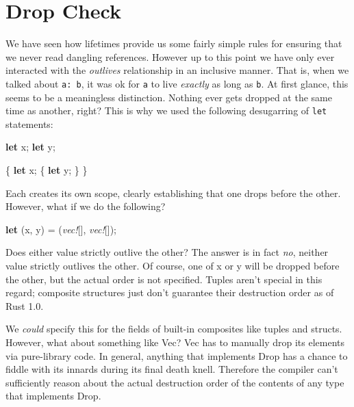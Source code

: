 \documentclass[a4paper,]{book}
\newenvironment{Shaded}{\begin{snugshade}}{\end{snugshade}}
\newcommand{\KeywordTok}[1]{\textcolor[rgb]{0.13,0.29,0.53}{\textbf{{#1}}}}
\newcommand{\PreprocessorTok}[1]{\textcolor[rgb]{0.56,0.35,0.01}{\textit{{#1}}}}
\newcommand{\NormalTok}[1]{{#1}}
\begin{document}
\section{Drop Check}\label{sec--dropck}

We have seen how lifetimes provide us some fairly simple rules for
ensuring that we never read dangling references. However up to this
point we have only ever interacted with the \emph{outlives} relationship
in an inclusive manner. That is, when we talked about
\texttt{\textquotesingle{}a:\ \textquotesingle{}b}, it was ok for
\texttt{\textquotesingle{}a} to live \emph{exactly} as long as
\texttt{\textquotesingle{}b}. At first glance, this seems to be a
meaningless distinction. Nothing ever gets dropped at the same time as
another, right? This is why we used the following desugarring of
\texttt{let} statements:

\begin{Shaded}
\begin{Highlighting}[]
\KeywordTok{let} \NormalTok{x;}
\KeywordTok{let} \NormalTok{y;}
\end{Highlighting}
\end{Shaded}

\begin{Shaded}
\begin{Highlighting}[]
\NormalTok{\{}
    \KeywordTok{let} \NormalTok{x;}
    \NormalTok{\{}
        \KeywordTok{let} \NormalTok{y;}
    \NormalTok{\}}
\NormalTok{\}}
\end{Highlighting}
\end{Shaded}

Each creates its own scope, clearly establishing that one drops before
the other. However, what if we do the following?

\begin{Shaded}
\begin{Highlighting}[]
\KeywordTok{let} \NormalTok{(x, y) = (}\PreprocessorTok{vec!}\NormalTok{[], }\PreprocessorTok{vec!}\NormalTok{[]);}
\end{Highlighting}
\end{Shaded}

Does either value strictly outlive the other? The answer is in fact
\emph{no}, neither value strictly outlives the other. Of course, one of
x or y will be dropped before the other, but the actual order is not
specified. Tuples aren't special in this regard; composite structures
just don't guarantee their destruction order as of Rust 1.0.

We \emph{could} specify this for the fields of built-in composites like
tuples and structs. However, what about something like Vec? Vec has to
manually drop its elements via pure-library code. In general, anything
that implements Drop has a chance to fiddle with its innards during its
final death knell. Therefore the compiler can't sufficiently reason
about the actual destruction order of the contents of any type that
implements Drop.
\end{document}
